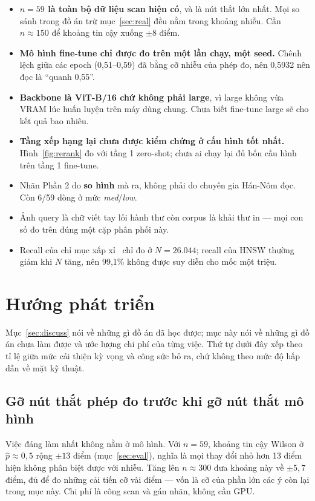 \documentclass[conference,a4paper]{IEEEtran}
\begin{document}
\begin{itemize}
  \item \textbf{$n = 59$ là toàn bộ dữ liệu scan hiện có}, và là nút thắt lớn nhất. Mọi so sánh trong
        đồ án trừ mục~\ref{sec:real} đều nằm trong khoảng nhiễu. Cần $n \approx 150$ để khoảng tin
        cậy xuống $\pm8$ điểm.
  \item \textbf{Mô hình fine-tune chỉ được đo trên một lần chạy, một seed.} Chênh lệch giữa các epoch
        (0,51--0,59) đã bằng cỡ nhiễu của phép đo, nên 0,5932 nên đọc là ``quanh 0,55''.
  \item \textbf{Backbone là ViT-B/16 chứ không phải large}, vì large không vừa VRAM lúc huấn luyện
        trên máy dùng chung. Chưa biết fine-tune large sẽ cho kết quả bao nhiêu.
  \item \textbf{Tầng xếp hạng lại chưa được kiểm chứng ở cấu hình tốt nhất.} Hình~\ref{fig:rerank}
        đo với tầng 1 zero-shot; chưa ai chạy lại đủ bốn cấu hình trên tầng 1 fine-tune.
  \item Nhãn Phần 2 do \textbf{so hình} mà ra, không phải do chuyên gia Hán-Nôm đọc. Còn 6/59 dòng
        ở mức \emph{med}/\emph{low}.
  \item Ảnh query là chữ viết tay lối hành thư còn corpus là khải thư in --- mọi con số đo trên đúng
        một cặp phân phối này.
  \item Recall của chỉ mục xấp xỉ~\cite{hnsw} chỉ đo ở $N = 26.044$; recall của HNSW thường giảm khi
        $N$ tăng, nên 99,1\% không được suy diễn cho mốc một triệu.
\end{itemize}

\section{Hướng phát triển}
\label{sec:future}

Mục~\ref{sec:discuss} nói về những gì đồ án đã học được; mục này nói về những gì đồ án chưa làm
được và ước lượng chi phí của từng việc. Thứ tự dưới đây xếp theo tỉ lệ giữa mức cải thiện kỳ vọng
và công sức bỏ ra, chứ không theo mức độ hấp dẫn về mặt kỹ thuật.

\subsection{Gỡ nút thắt phép đo trước khi gỡ nút thắt mô hình}

Việc đáng làm nhất không nằm ở mô hình. Với $n = 59$, khoảng tin cậy Wilson ở $\hat{p} \approx 0{,}5$
rộng $\pm13$ điểm (mục~\ref{sec:eval}), nghĩa là mọi thay đổi nhỏ hơn 13 điểm hiện không phân biệt
được với nhiễu. Tăng lên $n \approx 300$ đưa khoảng này về $\pm5{,}7$ điểm, đủ để đo những cải tiến
cỡ vài điểm --- vốn là cỡ của phần lớn các ý còn lại trong mục này. Chi phí là công scan và gán nhãn,
không cần GPU.
\end{document}
